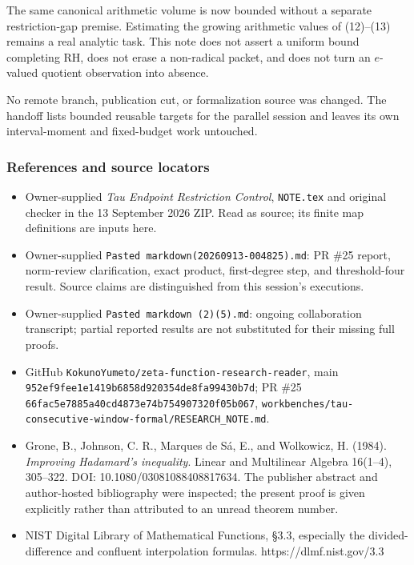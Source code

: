 The same canonical arithmetic volume is now bounded without a separate restriction-gap premise. Estimating the growing arithmetic values of (12)--(13) remains a real analytic task. This note does not assert a uniform bound completing RH, does not erase a non-radical packet, and does not turn an \(e\)-valued quotient observation into absence.

No remote branch, publication cut, or formalization source was changed. The handoff lists bounded reusable targets for the parallel session and leaves its own interval-moment and fixed-budget work untouched.

\subsubsection{References and source locators}\label{endpoint-relation_moment_original--references-and-source-locators}

\begin{itemize}
\tightlist
\item
  Owner-supplied \emph{Tau Endpoint Restriction Control}, \nolinkurl{NOTE.tex} and original checker in the 13 September 2026 ZIP. Read as source; its finite map definitions are inputs here.
\item
  Owner-supplied \texttt{Pasted\ markdown(20260913-004825).md}: PR \#25 report, norm-review clarification, exact product, first-degree step, and threshold-four result. Source claims are distinguished from this session's executions.
\item
  Owner-supplied \texttt{Pasted\ markdown\ (2)(5).md}: ongoing collaboration transcript; partial reported results are not substituted for their missing full proofs.
\item
  GitHub \nolinkurl{KokunoYumeto/zeta-function-research-reader}, main \nolinkurl{952ef9fee1e1419b6858d920354de8fa99430b7d}; PR \#25 \nolinkurl{66fac5e7885a40cd4873e74b754907320f05b067}, \nolinkurl{workbenches/tau-consecutive-window-formal/RESEARCH_NOTE.md}.
\item
  Grone, B., Johnson, C. R., Marques de Sá, E., and Wolkowicz, H. (1984). \emph{Improving Hadamard's inequality}. Linear and Multilinear Algebra 16(1--4), 305--322. DOI: 10.1080/03081088408817634. The publisher abstract and author-hosted bibliography were inspected; the present proof is given explicitly rather than attributed to an unread theorem number.
\item
  NIST Digital Library of Mathematical Functions, §3.3, especially the divided-difference and confluent interpolation formulas. https://dlmf.nist.gov/3.3
\end{itemize}
